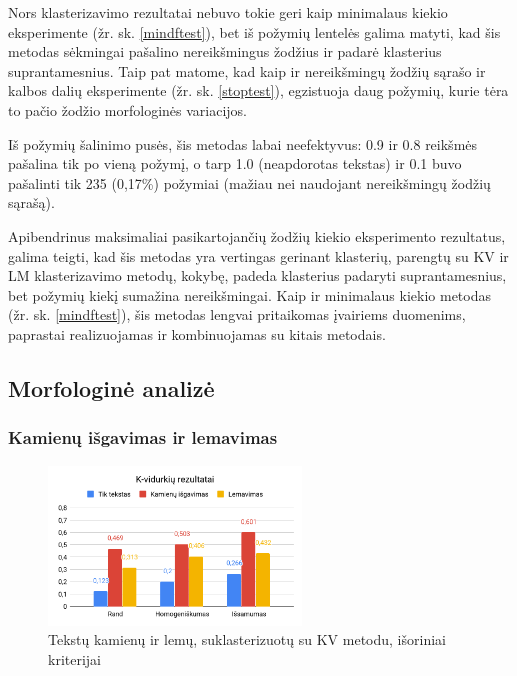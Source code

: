 \documentclass{VUMIFInfBakalaurinis}
\begin{document}
Nors klasterizavimo rezultatai nebuvo tokie geri kaip minimalaus kiekio eksperimente (žr. sk. \ref{mindftest}), bet iš požymių lentelės galima
matyti, kad šis metodas sėkmingai pašalino nereikšmingus žodžius ir
padarė klasterius suprantamesnius. Taip pat matome, kad kaip ir
 nereikšmingų žodžių sąrašo ir kalbos dalių eksperimente (žr. sk. \ref{stoptest}), egzistuoja
daug požymių, kurie tėra to pačio žodžio morfologinės variacijos.

Iš požymių šalinimo pusės, šis metodas labai neefektyvus: 0.9 ir 0.8
reikšmės pašalina tik po vieną požymį, o tarp 1.0 (neapdorotas tekstas)
ir 0.1 buvo pašalinti tik 235 (0,17\%) požymiai (mažiau nei naudojant
nereikšmingų žodžių sąrašą).

Apibendrinus maksimaliai pasikartojančių žodžių kiekio eksperimento
rezultatus, galima teigti, kad šis metodas yra vertingas gerinant
klasterių, parengtų su KV ir LM klasterizavimo metodų, kokybę, padeda
klasterius padaryti suprantamesnius, bet požymių kiekį sumažina
nereikšmingai. Kaip ir minimalaus kiekio metodas (žr. sk. \ref{mindftest}), šis
metodas lengvai pritaikomas įvairiems duomenims, paprastai realizuojamas
ir kombinuojamas su kitais metodais.

\subsection{Morfologinė analizė}

\subsubsection{Kamienų išgavimas ir lemavimas}\label{stemAndLem}

\begin{figure}[H]
	\centering
	\includegraphics[width=0.6\textwidth]{./img/image14.png}
  \caption{Tekstų kamienų ir lemų, suklasterizuotų su KV metodu, išoriniai
  kriterijai}
\end{figure}
\end{document}
